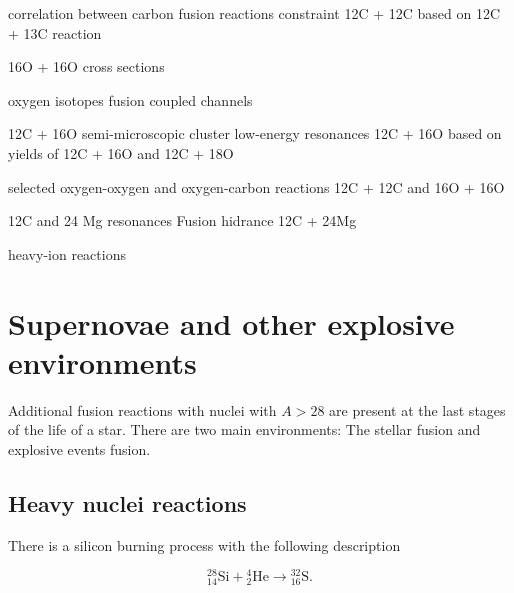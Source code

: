 \documentclass[openany]{book}
\begin{document}
correlation between carbon fusion reactions \cite{notani_esbensen_fang_bucher_davies_jiang_lamm_lin_ma_martin_et_2012}
constraint 12C + 12C based on 12C + 13C reaction \cite{zhang_wang_tudor_bucher_burducea_chen_chen_chesneanu_chilug_gasques_et_2020}

16O + 16O cross sections \cite{duarte_gasques_oliveira_zagatto_chamon_medina_added_seale_alcantara-nunez_rossi_et_2015}
\cite{kuronen_keinonen_tikkanen_1987}

oxygen isotopes fusion \cite{thomas_chen_hinds_meredith_olson_1986}
coupled channels \cite{guimin_deji_xiaowu_1992}

12C + 16O semi-microscopic cluster \cite{ferreira_lubian_linares_ermamatov_yepez-martinez_hess_2019}
low-energy resonances \cite{torilov_maltsev_zherebchevsky_2021}
12C + 16O based on yields of 12C + 16O and 12C + 18O \cite{chan_bohn_vandenbosch_sielemann_cramer_bernhardt_bhang_chiang_1979}

selected oxygen-oxygen and oxygen-carbon reactions \cite{kovar_geesaman_braid_eisen_henning_ophel_paul_rehm_sanders_sperr_et_1979}
\cite{wang_ren_bai_2020}
12C + 12C and 16O + 16O \cite{assuncao_descouvemont_2015}

12C and 24 Mg resonances \cite{descouvemont_2021}
Fusion hidrance 12C + 24Mg \cite{montagnoli_stefanini_jiang_colucci_goasduff_brugnara_mazzocco_siciliano_scarlassara_corradi_et_2020}

heavy-ion  reactions \cite{nobre_chamon_gasques_carlson_thompson_2007}


\section{Supernovae and other explosive environments} \label{sec:explosive}

Additional fusion reactions with nuclei with $A > 28$ are present at the last stages of the life of a star. There are two main environments: The stellar fusion and explosive events fusion.


\subsection{Heavy nuclei reactions} \label{sub:heavyReactions}

There is a silicon burning process with the following description 

\begin{equation} \label{eq:reaction_28Sialpha}
	\mathrm{{}^{28}_{14}Si +{}^{4}_{2}He \rightarrow {}^{32}_{16}S}.
\end{equation}
\end{document}
